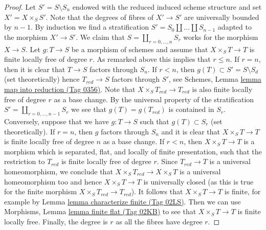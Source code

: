 \documentclass{amsart}
\theoremstyle{plain}
\theoremstyle{definition}
\theoremstyle{remark}
\numberwithin{equation}{subsection}
\begin{document}
\begin{proof}
\medskip\noindent
Let $S' = S \setminus S_n$ endowed with the reduced induced scheme
structure and set $X' = X \times_S S'$. Note that the degrees of fibres
of $X' \to S'$ are universally bounded by $n - 1$. By induction we find a
stratification $S' = S_0 \amalg \ldots \amalg S_{n - 1}$ adapted
to the morphism $X' \to S'$. We claim that $S = \coprod_{r = 0, \ldots, n} S_r$
works for the morphism $X \to S$. Let $g : T \to S$ be a morphism of schemes
and assume that $X \times_S T \to T$ is finite locally free of degree $r$.
As remarked above this implies that $r \leq n$. If $r = n$, then it is
clear that $T \to S$ factors through $S_n$. If $r < n$, then
$g(T) \subset S' = S \setminus S_d$ (set theoretically) hence
$T_{red} \to S$ factors through $S'$, see
Schemes, Lemma \href{https://stacks.math.columbia.edu/tag/0356}{lemma map into reduction (Tag 0356)}.
Note that $X \times_S T_{red} \to T_{red}$ is also
finite locally free of degree $r$ as a base change.
By the universal property of the stratification
$S' = \coprod_{r = 0, \ldots, n - 1} S_r$ we see that $g(T) = g(T_{red})$
is contained in $S_r$.
Conversely, suppose that we have $g : T \to S$ such that
$g(T) \subset S_r$ (set theoretically).
If $r = n$, then $g$ factors through $S_n$ and
it is clear that $X \times_S T \to T$
is finite locally free of degree $n$ as a base change.
If $r < n$, then $X \times_S T \to T$ is a morphism which is
separated, flat, and locally of finite presentation, such that
the restriction to $T_{red}$ is finite locally free of degree $r$.
Since $T_{red} \to T$ is a universal homeomorphism, we conclude
that $X \times_S T_{red} \to X \times_S T$ is a universal homeomorphism
too and hence $X \times_S T \to T$ is universally closed (as this
is true for the finite morphism $X \times_S T_{red} \to T_{red}$).
It follows that $X \times_S T \to T$ is finite, for example by
Lemma \href{https://stacks.math.columbia.edu/tag/02LS}{lemma characterize finite (Tag 02LS)}. Then we can use
Morphisms, Lemma \href{https://stacks.math.columbia.edu/tag/02KB}{lemma finite flat (Tag 02KB)}
to see that $X \times_S T \to T$ is finite locally free.
Finally, the degree is $r$ as all the fibres have degree $r$.
\end{proof}
\end{document}
